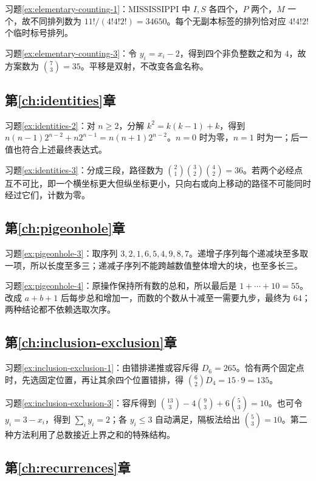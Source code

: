 \documentclass[UTF8,12pt,a4paper,fontset=fandol]{ctexbook}
\begin{document}
习题\ref{ex:elementary-counting-1}：$\mathrm{MISSISSIPPI}$ 中 $I,S$ 各四个，$P$ 两个，$M$ 一个，故不同排列数为 $11!/(4!4!2!)=34650$。每个无副本标签的排列恰对应 $4!4!2!$ 个临时标号排列。

习题\ref{ex:elementary-counting-3}：令 $y_i=x_i-2$，得到四个非负整数之和为 $4$，故方案数为 $\binom73=35$。平移是双射，不改变各盒名称。

\subsection{第\ref{ch:identities}章}

习题\ref{ex:identities-2}：对 $n\ge2$，分解 $k^2=k(k-1)+k$，得到 $n(n-1)2^{n-2}+n2^{n-1}=n(n+1)2^{n-2}$。$n=0$ 时为零，$n=1$ 时为一；后一值也符合上述最终表达式。

习题\ref{ex:identities-3}：分成三段，路径数为 $\binom21\binom32\binom42=36$。若两个必经点互不可比，即一个横坐标更大但纵坐标更小，只向右或向上移动的路径不可能同时经过它们，计数为零。

\subsection{第\ref{ch:pigeonhole}章}

习题\ref{ex:pigeonhole-3}：取序列 $3,2,1,6,5,4,9,8,7$。递增子序列每个递减块至多取一项，所以长度至多三；递减子序列不能跨越数值整体增大的块，也至多长三。

习题\ref{ex:pigeonhole-4}：原操作保持所有数的总和，所以最后是 $1+\cdots+10=55$。改成 $a+b+1$ 后每步总和增加一，而数的个数从十减至一需要九步，最终为 $64$；两种结论都不依赖选取次序。

\subsection{第\ref{ch:inclusion-exclusion}章}

习题\ref{ex:inclusion-exclusion-1}：由错排递推或容斥得 $D_6=265$。恰有两个固定点时，先选固定位置，再让其余四个位置错排，得 $\binom62D_4=15\cdot9=135$。

习题\ref{ex:inclusion-exclusion-3}：容斥得到 $\binom{13}{3}-4\binom93+6\binom53=10$。也可令 $y_i=3-x_i$，得到 $\sum_i y_i=2$；各 $y_i\le3$ 自动满足，隔板法给出 $\binom53=10$。第二种方法利用了总数接近上界之和的特殊结构。

\subsection{第\ref{ch:recurrences}章}
\end{document}
